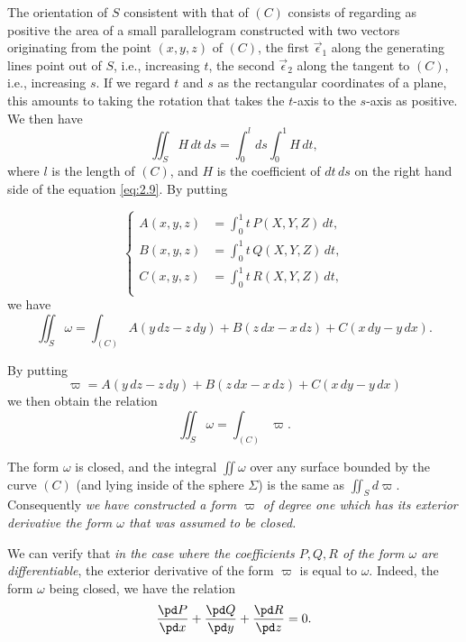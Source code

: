 The orientation of $S$ consistent with that of $(C)$ consists of regarding as positive the area of a small parallelogram constructed with two vectors originating from the point $(x,y,z)$ of $(C)$, the first $\vec{\epsilon}_{1}$ along the generating lines point out of $S$, {i.e.}, increasing $t$, the second $\vec{\epsilon}_{2}$ along the tangent to $(C)$, {i.e.}, increasing $s$. If we regard $t$ and $s$ as the rectangular coordinates of a plane, this amounts to taking the rotation that takes the $t$-axis to the $s$-axis as positive. We then have
\[
\iint_{S}H\,dt\,ds=\int_{0}^{l}ds\int_{0}^{1}H\,dt,
\]
where $l$ is the length of $(C)$, and $H$ is the coefficient of $dt\,ds$ on the right hand side of the equation \eqref{eq:2.9}. By putting

\begin{equation}
  \label{eq:2.10}
  \left\{
    \begin{aligned}
      A(x,y,z)&=\int_{0}^{1}t\,P(X,Y,Z)\,dt,\\
      B(x,y,z)&=\int_{0}^{1}t\,Q(X,Y,Z)\,dt,\\
      C(x,y,z)&=\int_{0}^{1}t\,R(X,Y,Z)\,dt,\\
    \end{aligned}
  \right.
\end{equation}
we have
\[
\iint_{S}\omega=\int_{(C)}A(y\,dz-z\,dy)+B(z\,dx-x\,dz)+C(x\,dy-y\,dx).
\]

By putting
\begin{equation}
  \label{eq:2.11}
  \varpi=A(y\,dz-z\,dy)+B(z\,dx-x\,dz)+C(x\,dy-y\,dx)
\end{equation}
we then obtain the relation
\[
\iint_{S}\omega=\int_{(C)}\varpi.
\]

The form $\omega$ is closed, and the integral $\iint\omega$ over any surface bounded by the curve $(C)$ (and lying inside of the sphere $\Sigma$) is the same as $\iint_{S}d\varpi$. Consequently \emph{we have constructed a form $\varpi$ of degree one which has its exterior derivative the form $\omega$ that was assumed to be closed.}

\vspace{12pt}\fsec We can verify that \emph{in the case where the coefficients $P,Q,R$ of the form $\omega$ are differentiable}, the exterior derivative of the form $\varpi$ is equal to $\omega$. Indeed, the form $\omega$ being closed, we have the relation
\begin{equation}
  \label{eq:2.12}
  \frac{\pd P}{\pd x}+\frac{\pd Q}{\pd y}+\frac{\pd R}{\pd z}=0.
\end{equation}

